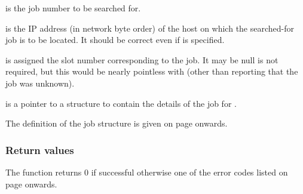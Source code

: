  is the job number to be searched for.

 is the IP address (in network byte order) of
the host on which the searched-for job is to be located. It should be
correct even if  is
specified.

 is assigned the slot number corresponding to
the job. It may be null is not required, but this would be nearly
pointless with \funcXBjobfindslot{} (other than
reporting that the job was unknown).

 is a pointer to a structure to contain the
details of the job for \funcXBjobfind{}.

The definition of the job structure is given on page
\pageref{bkm:Jobstructure} onwards.

\subsubsection{Return values}
The function returns 0 if successful otherwise one of the error codes
listed on page \pageref{errorcodes} onwards.

